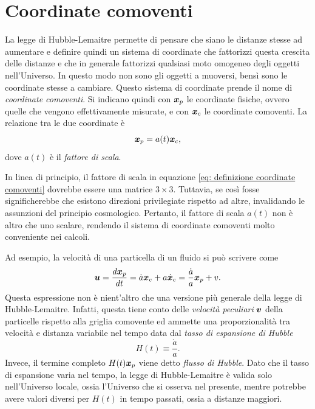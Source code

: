 \section{Coordinate comoventi}
La legge di Hubble-Lemaitre permette di pensare che siano le distanze stesse ad aumentare e definire quindi un sistema di coordinate che fattorizzi questa crescita delle distanze e che in generale fattorizzi qualsiasi moto omogeneo degli oggetti nell'Universo. In questo modo non sono gli oggetti a muoversi, bensì sono le coordinate stesse a cambiare. Questo sistema di coordinate prende il nome di \emph{coordinate comoventi}. Si indicano quindi con $\bm{x}_p$ le coordinate fisiche, ovvero quelle che vengono effettivamente misurate, e con $\bm{x}_c$ le coordinate comoventi. La relazione tra le due coordinate è
\begin{equation}
\label{eq: definizione coordinate comoventi}
    \bm{x}_p = a(t)\bm{x}_c,
\end{equation}
dove $a(t)$ è il \emph{fattore di scala}.
\begin{obs}
    In linea di principio, il fattore di scala in equazione \eqref{eq: definizione coordinate comoventi} dovrebbe essere una matrice $3 \times 3$. Tuttavia, se così fosse significherebbe che esistono direzioni privilegiate rispetto ad altre, invalidando le assunzioni del principio cosmologico. Pertanto, il fattore di scala $a(t)$ non è altro che uno scalare, rendendo il sistema di coordinate comoventi molto conveniente nei calcoli.
\end{obs}
Ad esempio, la velocità di una particella di un fluido si può scrivere come 
\begin{equation}
\label{eq: flusso di Hubble}
    \bm{u} = \frac{d\bm{x}_p}{dt} = \dot{a}\bm{x}_c + a\dot{\bm{x}}_c = \frac{\dot{a}}{a}\bm{x}_p + v.
\end{equation}
Questa espressione non è nient'altro che una versione più generale della legge di Hubble-Lemaitre. Infatti, questa tiene conto delle \emph{velocità peculiari} $\bm{v}$ della particelle rispetto alla griglia comovente ed ammette una proporzionalità tra velocità e distanza variabile nel tempo data dal \emph{tasso di espansione di Hubble}
\begin{equation}
    H(t) \equiv \frac{\dot{a}}{a}.
\end{equation}
Invece, il termine completo $H(t)\bm{x}_p$ viene detto \emph{flusso di Hubble}. Dato che il tasso di espansione varia nel tempo, la legge di Hubble-Lemaitre è valida solo nell'Universo locale, ossia l'Universo che si osserva nel presente, mentre potrebbe avere valori diversi per $H(t)$ in tempo passati, ossia a distanze maggiori. 
